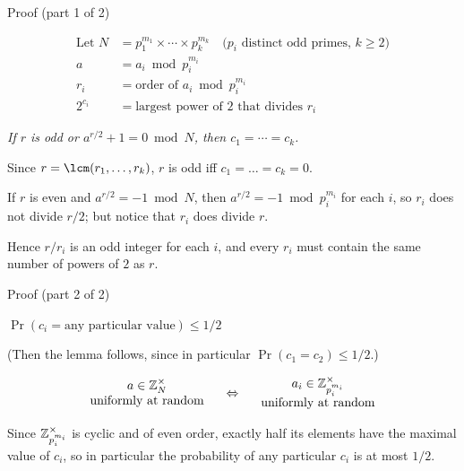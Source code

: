 
\begin{frame}{Proof (part 1 of 2)}

\begin{align*}
\text{Let~} 
N &= p_1^{m_1} \times \cdots \times p_k^{m_k}
\quad\text{($p_i$ distinct odd primes, $k \ge 2$)} \\
a &= a_i \bmod p_i^{m_i} \\
r_i &= \text{order of $a_i \bmod p_i^{m_i}$} \\
2^{c_i} &= \text{largest power of $2$ that divides $r_i$}
\end{align*}

\pause
\bigskip

\claim[ 1]
\emph{If $r$ is odd or $a^{r/2}+1 = 0 \bmod N$, then $c_1=\cdots=c_k$.}

\pause
\bigskip

Since $r=\lcm(r_1,\ldots,r_k)$, $r$ is odd iff $c_1=\ldots=c_k=0$.

\pause
\medskip

If $r$ is even and $a^{r/2}=-1 \bmod N$, then $a^{r/2}=-1 \bmod p_i^{m_i}$ for each $i$, so $r_i$ does not divide $r/2$; but notice that $r_i$ does divide $r$.

\pause
\medskip

Hence $r/r_i$ is an odd integer for each $i$, and every $r_i$ must contain the same number of powers of $2$ as $r$.
\end{frame}


\begin{frame}{Proof (part 2 of 2)}

\claim[ 2]
\emph{$\Pr(c_i=\text{any particular value}) \le 1/2$}

\pause
\bigskip

(Then the lemma follows, since in particular $\Pr(c_1=c_2) \le 1/2$.)

\pause
\bigskip

\[
\begin{array}{c}
  a \in {\mathbb{Z}}_N^\times \\
  \text{uniformly at random}
\end{array}
\quad\Leftrightarrow\quad
\begin{array}{c}
  a_i \in {\mathbb{Z}}_{p_i^{m_i}}^\times \\
  \text{uniformly at random}
\end{array}
\]

\pause
\bigskip

Since ${\mathbb{Z}}_{p_i^{m_i}}^\times$ is cyclic and of even order, exactly half its elements have the maximal value of $c_i$, so in particular the probability of any particular $c_i$ is at most $1/2$.
\end{frame}

